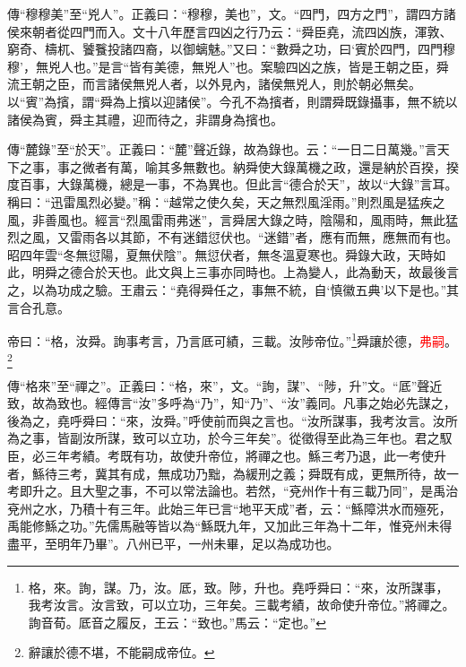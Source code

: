 {\noindent\zhuan{}\fzbyks 傳“穆穆美”至“兇人”。正義曰：“穆穆，美也”，文。“四門，四方之門”，謂四方諸侯來朝者從四門而入。文十八年歷言四凶之行乃云：“舜臣堯，流四凶族，渾敦、窮奇、檮杌、饕餮投諸四裔，以御螭魅。”又曰：“數舜之功，曰‘賓於四門，四門穆穆’，無兇人也。”是言“皆有美德，無兇人”也。案驗四凶之族，皆是王朝之臣，舜流王朝之臣，而言諸侯無兇人者，以外見內，諸侯無兇人，則於朝必無矣。以“賓”為擯，謂“舜為上擯以迎諸侯”。今孔不為擯者，則謂舜既錄攝事，無不統以諸侯為賓，舜主其禮，迎而待之，非謂身為擯也。 \par}

{\noindent\zhuan{}\fzbyks 傳“麓錄”至“於天”。正義曰：“麓”聲近錄，故為錄也。云：“一日二日萬幾。”言天下之事，事之微者有萬，喻其多無數也。納舜使大錄萬機之政，還是納於百揆，揆度百事，大錄萬機，總是一事，不為異也。但此言“德合於天”，故以“大錄”言耳。稱曰：“迅雷風烈必變。”稱：“越常之使久矣，天之無烈風淫雨。”則烈風是猛疾之風，非善風也。經言“烈風雷雨弗迷”，言舜居大錄之時，陰陽和，風雨時，無此猛烈之風，又雷雨各以其節，不有迷錯愆伏也。“迷錯”者，應有而無，應無而有也。昭四年雲“冬無愆陽，夏無伏陰”。無愆伏者，無冬溫夏寒也。舜錄大政，天時如此，明舜之德合於天也。此文與上三事亦同時也。上為變人，此為動天，故最後言之，以為功成之驗。王肅云：“堯得舜任之，事無不統，自‘慎徽五典’以下是也。”其言合孔意。 \par}

帝曰：“格，汝舜。詢事考言，乃言厎可績，三載。汝陟帝位。”\footnote{格，來。詢，謀。乃，汝。厎，致。陟，升也。堯呼舜曰：“來，汝所謀事，我考汝言。汝言致，可以立功，三年矣。三載考績，故命使升帝位。”將禪之。詢音荀。厎音之履反，王云：“致也。”馬云：“定也。”}舜讓於德，\textcolor{red}{弗嗣}。\footnote{辭讓於德不堪，不能嗣成帝位。}

{\noindent\zhuan{}\fzbyks 傳“格來”至“禪之”。正義曰：“格，來”，文。“詢，謀”、“陟，升”文。“厎”聲近致，故為致也。經傳言“汝”多呼為“乃”，知“乃”、“汝”義同。凡事之始必先謀之，後為之，堯呼舜曰：“來，汝舜。”呼使前而與之言也。“汝所謀事，我考汝言。汝所為之事，皆副汝所謀，致可以立功，於今三年矣”。從徵得至此為三年也。君之馭臣，必三年考績。考既有功，故使升帝位，將禪之也。鯀三考乃退，此一考使升者，鯀待三考，冀其有成，無成功乃黜，為緩刑之義；舜既有成，更無所待，故一考即升之。且大聖之事，不可以常法論也。若然，“兗州作十有三載乃同”，是禹治兗州之水，乃積十有三年。此始三年已言“地平天成”者，云：“鯀障洪水而殛死，禹能修鯀之功。”先儒馬融等皆以為“鯀既九年，又加此三年為十二年，惟兗州未得盡平，至明年乃畢”。八州已平，一州未畢，足以為成功也。 \par}

